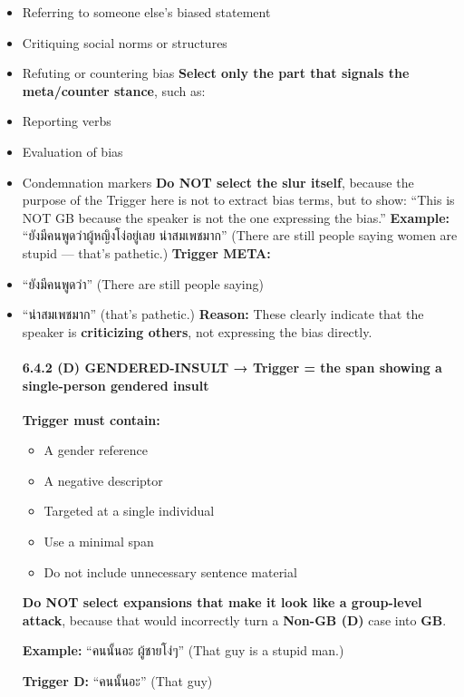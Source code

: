\documentclass[12pt,oneside,openright,a4paper]{cpe-english-project}
\begin{document}
\begin{itemize}
\setlength{\itemsep}{0.15\baselineskip}
\setlength{\parsep}{0pt}
\setlength{\parskip}{0pt}
\item
  Referring to someone else's biased statement
\item
  Critiquing social norms or structures
\item
  Refuting or countering bias
  \textbf{Select only the part that signals the meta/counter stance},
  such as:
\item
  Reporting verbs
\item
  Evaluation of bias
\item
  Condemnation markers
  \textbf{Do NOT select the slur itself}, because the purpose of the
  Trigger here is not to extract bias terms, but to show: ``This is NOT
  GB because the speaker is not the one expressing the bias.''
  \textbf{Example:} ``ยังมีคนพูดว่าผู้หญิงโง่อยู่เลย น่าสมเพชมาก''
  (There are still people saying women are stupid --- that's
  pathetic.)
  \textbf{Trigger META:}
\item
  ``ยังมีคนพูดว่า'' (There are still people saying)
\item
  ``น่าสมเพชมาก'' (that's pathetic.)
  \textbf{Reason:} These clearly indicate that the speaker is
  \textbf{criticizing others}, not expressing the bias directly.

  \paragraph{6.4.2 (D) GENDERED-INSULT → Trigger = the span showing a single-person gendered insult}\label{d-gendered-insult-trigger-the-span-showing-a-single-person-gendered-insult}

  \textbf{Trigger must contain:}

  \begin{itemize}
\setlength{\itemsep}{0.15\baselineskip}
\setlength{\parsep}{0pt}
\setlength{\parskip}{0pt}
    \item
    A gender reference
  \item
    A negative descriptor
  \item
    Targeted at a single individual
  \item
    Use a minimal span
  \item
    Do not include unnecessary sentence material
  \end{itemize}

  \textbf{Do NOT select expansions that make it look like a group-level
  attack}, because that would incorrectly turn a \textbf{Non-GB (D)}
  case into \textbf{GB}.

  \textbf{Example:} ``คนนั้นอะ ผู้ชายโง่ๆ'' (That guy is a stupid man.)

  \textbf{Trigger D:} ``คนนั้นอะ'' (That guy)
\end{itemize}
\end{document}
